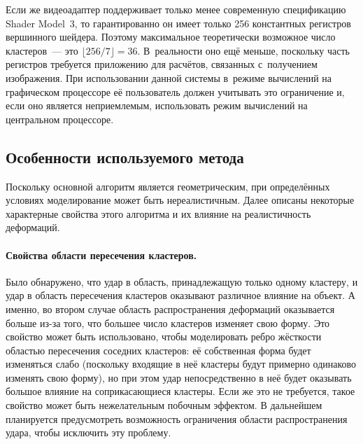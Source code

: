 \documentclass[a4paper, 14pt, titlepage]{extarticle}
\newcommand{\eng}[1]{{\English #1}}
\begin{document}
        Если же видеоадаптер поддерживает только менее современную спецификацию \eng{Shader
        Model~3}, то гарантированно он имеет только 256 константных регистров вершинного шейдера.
        Поэтому максимальное теоретически возможное число кластеров~--- это $\lfloor 256/7 \rfloor = 36$.
        В~реальности оно ещё меньше, поскольку часть регистров требуется приложению для
        расчётов, связанных с~получением изображения. При использовании данной системы в~режиме
        вычислений на графическом процессоре её пользователь должен учитывать это ограничение и,
        если оно является неприемлемым, использовать режим вычислений на центральном процессоре.

    \subsection{Особенности используемого метода}

        Поскольку основной алгоритм является геометрическим, при определённых условиях моделирование
        может быть нереалистичным. Далее описаны некоторые характерные свойства этого алгоритма и их
        влияние на реалистичность деформаций.

        \paragraph{Свойства области пересечения кластеров.} Было обнаружено, что удар в область,
        принадлежащую только одному кластеру, и удар в область пересечения кластеров оказывают
        различное влияние на объект. А именно, во втором случае область распространения деформаций
        оказывается больше из-за того, что большее число кластеров изменяет свою форму. Это свойство
        может быть использовано, чтобы моделировать ребро жёсткости областью пересечения соседних
        кластеров: её собственная форма будет изменяться слабо (поскольку входящие в неё кластеры
        будут примерно одинаково изменять свою форму), но при этом удар непосредственно в неё будет
        оказывать большое влияние на соприкасающиеся кластеры. Если же это не требуется, такое
        свойство может быть нежелательным побочным эффектом. В дальнейшем планируется предусмотреть
        возможность ограничения области распространения удара, чтобы исключить эту проблему.
\end{document}
